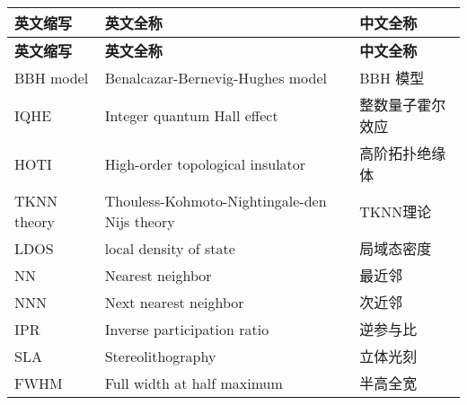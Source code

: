 \cleardoublepage
{}
\begin{center}
    \begin{longtable}{m{2cm}m{8cm}m{5cm}}
        \toprule
        \textbf{英文缩写}&\textbf{英文全称}&\textbf{中文全称}\\
        \midrule
        \endfirsthead
        \toprule
        \textbf{英文缩写}&\textbf{英文全称}&\textbf{中文全称}\\
        \midrule
        \endhead 
        \bottomrule
        \endfoot
        \bottomrule
        \endlastfoot
        BBH model&Benalcazar-Bernevig-Hughes model&BBH 模型\\
        IQHE&Integer quantum Hall effect&整数量子霍尔效应\\
        HOTI&High-order topological insulator&高阶拓扑绝缘体\\
        TKNN theory&Thouless-Kohmoto-Nightingale-den Nijs theory &TKNN理论\\
        LDOS&local density of state&局域态密度\\
        NN&Nearest neighbor&最近邻\\
        NNN&Next nearest neighbor&次近邻\\
        IPR&Inverse participation ratio&逆参与比\\
        SLA&Stereolithography&立体光刻\\
        FWHM&Full width at half maximum&半高全宽\\
	\end{longtable}
\end{center}